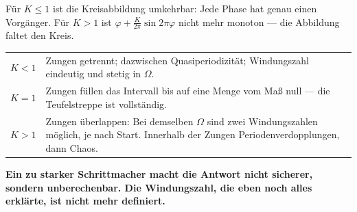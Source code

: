 \begin{warnung}
Für $K \le 1$ ist die Kreisabbildung umkehrbar: Jede Phase hat genau einen Vorgänger. Für $K > 1$ ist $\varphi + \frac{K}{2\pi}\sin2\pi\varphi$ nicht mehr monoton --- die Abbildung faltet den Kreis.

\begin{center}
{\small
\renewcommand{\arraystretch}{1.5}
\begin{tabular}{@{}P{2.4cm}P{6.4cm}@{}}
\toprule
$K < 1$ & Zungen getrennt; dazwischen Quasiperiodizität; Windungszahl eindeutig und stetig in $\Omega$.\\
$K = 1$ & Zungen füllen das Intervall bis auf eine Menge vom Maß null --- die Teufelstreppe ist vollständig.\\
$K > 1$ & Zungen überlappen: Bei demselben $\Omega$ sind zwei Windungszahlen möglich, je nach Start. Innerhalb der Zungen Periodenverdopplungen, dann Chaos.\\
\bottomrule
\end{tabular}}
\end{center}

\begin{center}
\begin{minipage}{0.9\textwidth}
\textbf{Ein zu starker Schrittmacher macht die Antwort nicht sicherer, sondern unberechenbar. Die Windungszahl, die eben noch alles erklärte, ist nicht mehr definiert.}
\end{minipage}
\end{center}

\begin{center}
\begin{minipage}{0.88\textwidth}
\end{minipage}
\end{center}
\end{warnung}

